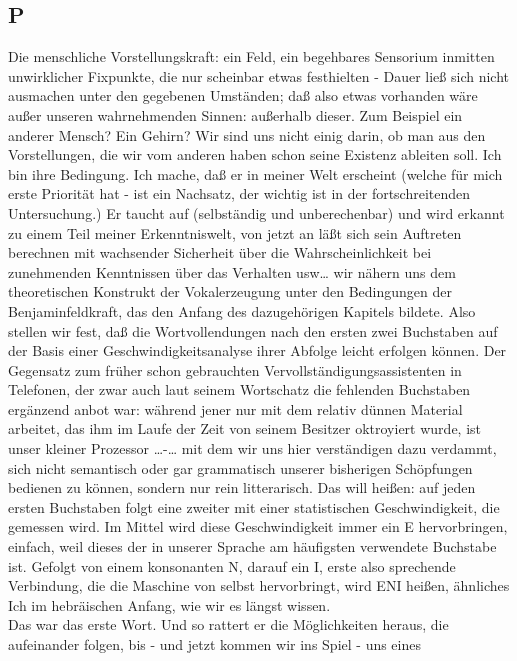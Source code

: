 \documentclass[
]{article}
\author{}
\date{\vspace{-2.5em}}
\begin{document}
\subsection{P}\label{p}

Die menschliche Vorstellungskraft: ein Feld, ein begehbares Sensorium
inmitten unwirklicher Fixpunkte, die nur scheinbar etwas festhielten -
Dauer ließ sich nicht ausmachen unter den gegebenen Umständen; daß also
etwas vorhanden wäre außer unseren wahrnehmenden Sinnen: außerhalb
dieser. Zum Beispiel ein anderer Mensch? Ein Gehirn? Wir sind uns nicht
einig darin, ob man aus den Vorstellungen, die wir vom anderen haben
schon seine Existenz ableiten soll. Ich bin ihre Bedingung. Ich mache,
daß er in meiner Welt erscheint (welche für mich erste Priorität hat -
ist ein Nachsatz, der wichtig ist in der fortschreitenden Untersuchung.)
Er taucht auf (selbständig und unberechenbar) und wird erkannt zu einem
Teil meiner Erkenntniswelt, von jetzt an läßt sich sein Auftreten
berechnen mit wachsender Sicherheit über die Wahrscheinlichkeit bei
zunehmenden Kenntnissen über das Verhalten usw\ldots{} wir nähern uns
dem theoretischen Konstrukt der Vokalerzeugung unter den Bedingungen der
Benjaminfeldkraft, das den Anfang des dazugehörigen Kapitels bildete.
Also stellen wir fest, daß die Wortvollendungen nach den ersten zwei
Buchstaben auf der Basis einer Geschwindigkeitsanalyse ihrer Abfolge
leicht erfolgen können. Der Gegensatz zum früher schon gebrauchten
Vervollständigungsassistenten in Telefonen, der zwar auch laut seinem
Wortschatz die fehlenden Buchstaben ergänzend anbot war: während jener
nur mit dem relativ dünnen Material arbeitet, das ihm im Laufe der Zeit
von seinem Besitzer oktroyiert wurde, ist unser kleiner Prozessor
\ldots-\ldots{} mit dem wir uns hier verständigen dazu verdammt, sich
nicht semantisch oder gar grammatisch unserer bisherigen Schöpfungen
bedienen zu können, sondern nur rein litterarisch. Das will heißen: auf
jeden ersten Buchstaben folgt eine zweiter mit einer statistischen
Geschwindigkeit, die gemessen wird. Im Mittel wird diese Geschwindigkeit
immer ein E hervorbringen, einfach, weil dieses der in unserer Sprache
am häufigsten verwendete Buchstabe ist. Gefolgt von einem konsonanten N,
darauf ein I, erste also sprechende Verbindung, die die Maschine von
selbst hervorbringt, wird ENI heißen, ähnliches Ich im hebräischen
Anfang, wie wir es längst wissen.\\
Das war das erste Wort. Und so rattert er die Möglichkeiten heraus, die
aufeinander folgen, bis - und jetzt kommen wir ins Spiel - uns eines
\end{document}
